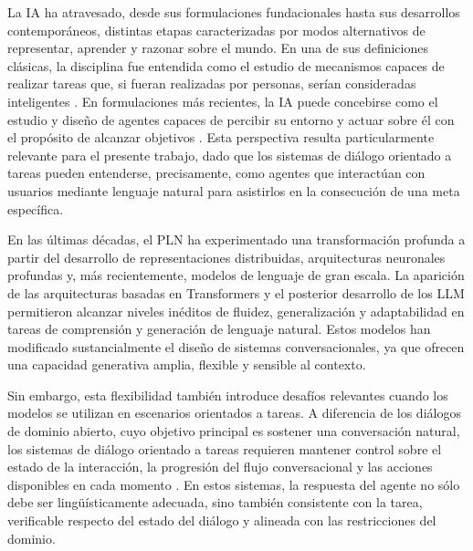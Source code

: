 
La \ac{IA} ha atravesado, desde sus formulaciones fundacionales hasta sus desarrollos
contemporáneos, distintas etapas caracterizadas por modos alternativos de representar,
aprender y razonar sobre el mundo. En una de sus definiciones clásicas, la disciplina
fue entendida como el estudio de mecanismos capaces de realizar tareas que, si fueran
realizadas por personas, serían consideradas inteligentes \citep{minsky1961steps}.
En formulaciones más recientes, la \ac{IA} puede concebirse como el estudio y diseño
de agentes capaces de percibir su entorno y actuar sobre él con el propósito de alcanzar
objetivos \citep{russell2020artificial}. Esta perspectiva resulta particularmente
relevante para el presente trabajo, dado que los sistemas de diálogo orientado a tareas
pueden entenderse, precisamente, como agentes que interactúan con usuarios mediante
lenguaje natural para asistirlos en la consecución de una meta específica.

En las últimas décadas, el \ac{PLN} ha experimentado una transformación profunda a
partir del desarrollo de representaciones distribuidas, arquitecturas neuronales profundas
y, más recientemente, modelos de lenguaje de gran escala. La aparición de las
arquitecturas basadas en Transformers \citep{vaswani2017attention} y el posterior
desarrollo de los \ac{LLM} \citep{brown2020language,touvron2023llama} permitieron
alcanzar niveles inéditos de fluidez, generalización y adaptabilidad en tareas de
comprensión y generación de lenguaje natural. Estos modelos han modificado
sustancialmente el diseño de sistemas conversacionales, ya que ofrecen una capacidad
generativa amplia, flexible y sensible al contexto.

Sin embargo, esta flexibilidad también introduce desafíos relevantes cuando los modelos
se utilizan en escenarios orientados a tareas. A diferencia de los diálogos de dominio
abierto, cuyo objetivo principal es sostener una conversación natural, los sistemas de
diálogo orientado a tareas requieren mantener control sobre el estado de la interacción,
la progresión del flujo conversacional y las acciones disponibles en cada momento
\citep{young2013pomdp,gao2019neural}. En estos sistemas, la respuesta del agente no
sólo debe ser lingüísticamente adecuada, sino también consistente con la tarea, verificable
respecto del estado del diálogo y alineada con las restricciones del dominio.

